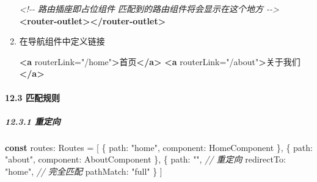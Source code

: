 \documentclass[
]{article}
\newenvironment{Shaded}{}{}
\newcommand{\CommentTok}[1]{\textcolor[rgb]{0.38,0.63,0.69}{\textit{#1}}}
\newcommand{\DataTypeTok}[1]{\textcolor[rgb]{0.56,0.13,0.00}{#1}}
\newcommand{\KeywordTok}[1]{\textcolor[rgb]{0.00,0.44,0.13}{\textbf{#1}}}
\newcommand{\NormalTok}[1]{#1}
\newcommand{\OperatorTok}[1]{\textcolor[rgb]{0.40,0.40,0.40}{#1}}
\newcommand{\OtherTok}[1]{\textcolor[rgb]{0.00,0.44,0.13}{#1}}
\newcommand{\StringTok}[1]{\textcolor[rgb]{0.25,0.44,0.63}{#1}}
\begin{document}
\begin{enumerate}
\begin{Shaded}
\begin{Highlighting}[]
\CommentTok{\textless{}!{-}{-} 路由插座即占位组件 匹配到的路由组件将会显示在这个地方 {-}{-}\textgreater{}}
\KeywordTok{\textless{}router{-}outlet\textgreater{}\textless{}/router{-}outlet\textgreater{}}
\end{Highlighting}
\end{Shaded}
\item
  在导航组件中定义链接

\begin{Shaded}
\begin{Highlighting}[]
\KeywordTok{\textless{}a}\OtherTok{ routerLink=}\StringTok{"/home"}\KeywordTok{\textgreater{}}\NormalTok{首页}\KeywordTok{\textless{}/a\textgreater{}}
\KeywordTok{\textless{}a}\OtherTok{ routerLink=}\StringTok{"/about"}\KeywordTok{\textgreater{}}\NormalTok{关于我们}\KeywordTok{\textless{}/a\textgreater{}}
\end{Highlighting}
\end{Shaded}
\end{enumerate}

\hypertarget{123-ux5339ux914dux89c4ux5219}{%
\paragraph{12.3 匹配规则}\label{123-ux5339ux914dux89c4ux5219}}

\hypertarget{1231-ux91cdux5b9aux5411}{%
\subparagraph{12.3.1 重定向}\label{1231-ux91cdux5b9aux5411}}

\begin{Shaded}
\begin{Highlighting}[]
\KeywordTok{const}\NormalTok{ routes}\OperatorTok{:}\NormalTok{ Routes }\OperatorTok{=}\NormalTok{ [}
\NormalTok{  \{}
    \DataTypeTok{path}\OperatorTok{:} \StringTok{"home"}\OperatorTok{,}
    \DataTypeTok{component}\OperatorTok{:}\NormalTok{ HomeComponent}
\NormalTok{  \}}\OperatorTok{,}
\NormalTok{  \{}
    \DataTypeTok{path}\OperatorTok{:} \StringTok{"about"}\OperatorTok{,}
    \DataTypeTok{component}\OperatorTok{:}\NormalTok{ AboutComponent}
\NormalTok{  \}}\OperatorTok{,}
\NormalTok{  \{}
    \DataTypeTok{path}\OperatorTok{:} \StringTok{""}\OperatorTok{,}
    \CommentTok{// 重定向}
    \DataTypeTok{redirectTo}\OperatorTok{:} \StringTok{"home"}\OperatorTok{,}
    \CommentTok{// 完全匹配}
    \DataTypeTok{pathMatch}\OperatorTok{:} \StringTok{"full"}
\NormalTok{  \}}
\NormalTok{]}
\end{Highlighting}
\end{Shaded}
\end{document}
